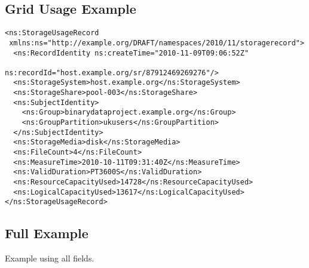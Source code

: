 \subsection{Grid Usage Example}

\begin{verbatim}
<ns:StorageUsageRecord
 xmlns:ns="http://example.org/DRAFT/namespaces/2010/11/storagerecord">
  <ns:RecordIdentity ns:createTime="2010-11-09T09:06:52Z"
                     ns:recordId="host.example.org/sr/87912469269276"/>
  <ns:StorageSystem>host.example.org</ns:StorageSystem>
  <ns:StorageShare>pool-003</ns:StorageShare>
  <ns:SubjectIdentity>
    <ns:Group>binarydataproject.example.org</ns:Group>
    <ns:GroupPartition>ukusers</ns:GroupPartition>
  </ns:SubjectIdentity>
  <ns:StorageMedia>disk</ns:StorageMedia>
  <ns:FileCount>4</ns:FileCount>
  <ns:MeasureTime>2010-10-11T09:31:40Z</ns:MeasureTime>
  <ns:ValidDuration>PT3600S</ns:ValidDuration>
  <ns:ResourceCapacityUsed>14728</ns:ResourceCapacityUsed>
  <ns:LogicalCapacityUsed>13617</ns:LogicalCapacityUsed>
</ns:StorageUsageRecord>
\end{verbatim}

\subsection{Full Example}

Example using all fields.

